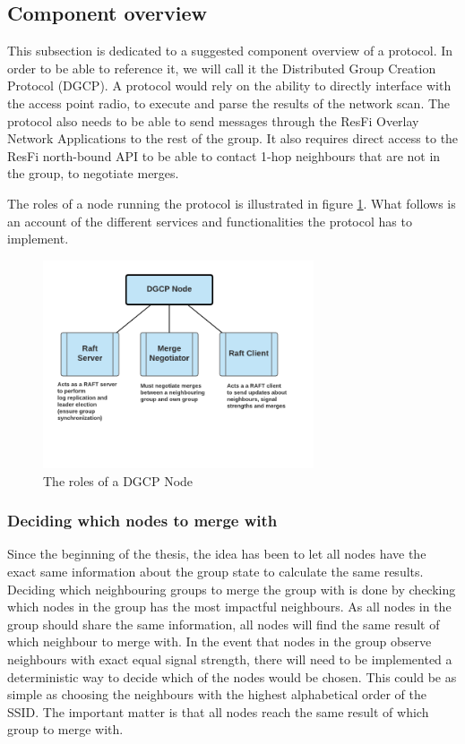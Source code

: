 \subsection{Component overview }
This subsection is dedicated to a suggested component overview of a protocol. In order to be able to reference it, we will call it the Distributed Group Creation Protocol (DGCP). 
A protocol would rely on the ability to directly interface with the access point radio, to execute and parse the results of the network scan. The protocol also
needs to be able to send messages through the ResFi Overlay Network Applications to the rest of the group. It also requires direct access to the ResFi north-bound API to be able to contact 1-hop
neighbours that are not in the group, to negotiate merges. 

The roles of a node running the protocol is illustrated in figure \ref{fig:dgcproles}. What follows is an account of the different services and functionalities the protocol
has to implement.  

\begin{figure}
	\centering
	\includegraphics[width=8cm]{Images/dgcpnode.png}
		\caption{The roles of a DGCP Node }%
		\label{fig:dgcproles}%
\end{figure}

\subsubsection{Deciding which nodes to merge with}
Since the beginning of the thesis, the idea has been to let all nodes have the exact same information about the group state to calculate the same results. Deciding
which neighbouring groups to merge the group with is done by checking which nodes in the group has the most impactful neighbours. As all nodes in the group should share
the same information, all nodes will find the same result of which neighbour to merge with.
In the event that nodes in the group observe neighbours with exact equal signal strength, there will need to be implemented a deterministic way to decide which of the nodes would be chosen.
This could be as simple as choosing the neighbours with the highest alphabetical order of the SSID. The important matter is that all nodes reach the same result of which group to merge with. 


